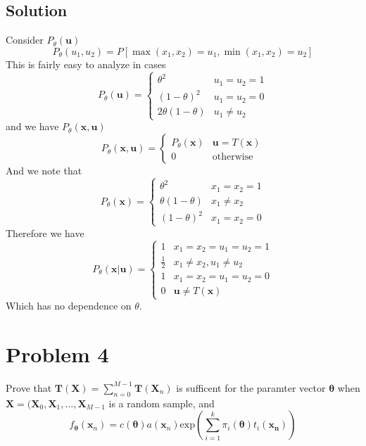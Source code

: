 \documentclass[a4paper]{article}
\begin{document}
\subsection*{Solution}%
Consider $P_{\theta}(\bm{u})$
\[
  P_{\theta}(u_1, u_2) = P[\max(x_1,x_2) = u_1, \min(x_1,x_2) = u_2]
\]
This is fairly easy to analyze in cases
\[
  P_{\theta}(\bm{u}) = 
  \begin{cases}
    \theta^2 & u_1=u_2=1 \\
    (1 - \theta)^2 & u_1=u_2=0 \\
    2\theta(1 - \theta) & u_1 \neq u_2
  \end{cases}
\]
and we have $P_{\theta}(\bm{x}, \bm{u})$
\[
  P_{\theta}(\bm{x}, \bm{u}) = 
  \begin{cases}
    P_{\theta}(\bm{x}) & \bm{u} = T(\bm{x}) \\
    0 & \text{otherwise}
  \end{cases}
\]
And we note that
\[
  P_{\theta}(\bm{x}) = 
  \begin{cases}
    \theta^2 & x_1 = x_2 = 1 \\
    \theta(1 - \theta) & x_1 \neq x_2 \\
    (1 - \theta)^2 & x_1 = x_2 = 0
  \end{cases}
\]
Therefore we have
\[
  P_{\theta}(\bm{x}|\bm{u}) = 
  \begin{cases}
    1 & x_1 = x_2 = u_1 = u_2 = 1 \\
    \frac{1}{2} & x_1 \neq x_2, u_1 \neq u_2 \\
    1 & x_1 = x_2 = u_1 = u_2 = 0 \\
    0 & \bm{u} \neq T(\bm{x})
  \end{cases}
\]
Which has no dependence on $\theta$.

\section*{Problem 4}%
Prove that $\bm{T}(\bm{X}) = \sum_{n=0}^{M-1} \bm{T}(\bm{X}_n)$  is sufficent for the paramter vector $\bm{\theta}$ when $\bm{X} = (\bm{X}_0, \bm{X}_1, \dots, \bm{X}_{M-1}$ is a random sample, and 
\[
  f_{\bm{\theta}}(\bm{x}_n) = c(\bm{\theta})a(\bm{x}_n) \text{exp} \left( \sum_{i=1}^k \pi_i(\bm{\theta})t_i(\bm{x_n}) \right)
\]
\end{document}

